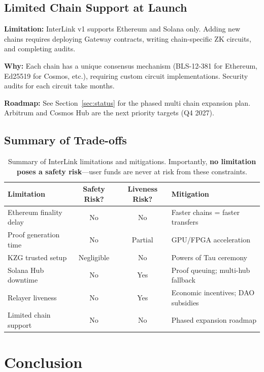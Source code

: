 \documentclass[11pt,a4paper]{article}
\begin{document}
\subsection{Limited Chain Support at Launch}

\textbf{Limitation:} InterLink v1 supports Ethereum and Solana only. Adding new chains requires deploying Gateway contracts, writing chain-specific ZK circuits, and completing audits.

\textbf{Why:} Each chain has a unique consensus mechanism (BLS-12-381 for Ethereum, Ed25519 for Cosmos, etc.), requiring custom circuit implementations. Security audits for each circuit take months.

\textbf{Roadmap:} See Section~\ref{sec:status} for the phased multi chain expansion plan. Arbitrum and Cosmos Hub are the next priority targets (Q4 2027).

\subsection{Summary of Trade-offs}

\begin{table}[H]
\centering
\begin{tabular}{@{}lccl@{}}
\toprule
\textbf{Limitation} & \textbf{Safety Risk?} & \textbf{Liveness Risk?} & \textbf{Mitigation} \\
\midrule
Ethereum finality delay & No & No & Faster chains = faster transfers \\
Proof generation time & No & Partial & GPU/FPGA acceleration \\
KZG trusted setup & Negligible & No & Powers of Tau ceremony \\
Solana Hub downtime & No & Yes & Proof queuing; multi-hub fallback \\
Relayer liveness & No & Yes & Economic incentives; DAO subsidies \\
Limited chain support & No & No & Phased expansion roadmap \\
\bottomrule
\end{tabular}
\caption{Summary of InterLink limitations and mitigations. Importantly, \textbf{no limitation poses a safety risk}---user funds are never at risk from these constraints.}
\end{table}

\section{Conclusion}
\end{document}
